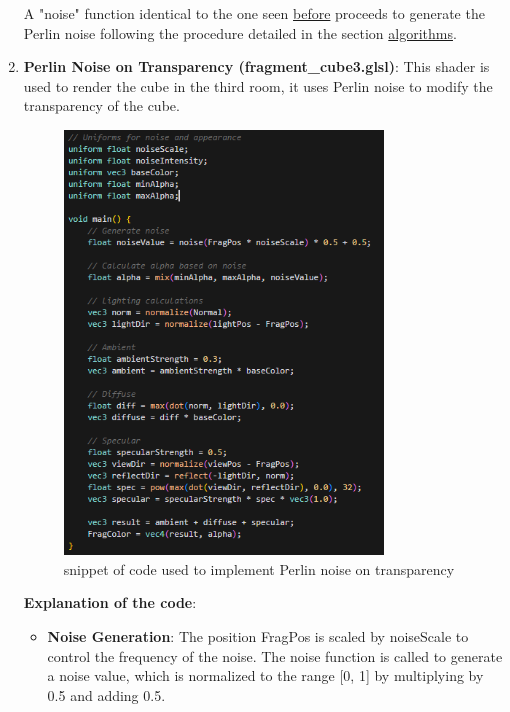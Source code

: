 \documentclass[12pt]{article}
\begin{document}
\begin{enumerate}
    A "noise" function identical to the one seen \hyperref[img:noiseFunction]{before} proceeds to generate the Perlin noise following the procedure detailed in the section \hyperref[sec:algorithms]{algorithms}.

    \newpage

    \item \textbf{Perlin Noise on Transparency (fragment\_cube3.glsl)}:
    \newline
    This shader is used to render the cube in the third room, it uses Perlin noise to modify the transparency of the cube.

    \begin{figure}[H]
        \centering
        \includegraphics[width=0.8\textwidth]{Images/cube3code.png}
        \caption{snippet of code used to implement Perlin noise on transparency}
    \end{figure}

    \textbf{Explanation of the code}:
    \begin {itemize}
        \item \textbf{Noise Generation}:
        \newline
        The position FragPos is scaled by noiseScale to control the frequency of the noise. The noise function is called to generate a noise value, which is normalized to the range [0, 1] by multiplying by 0.5 and adding 0.5.


\end{itemize}
\end{enumerate}
\end{document}
